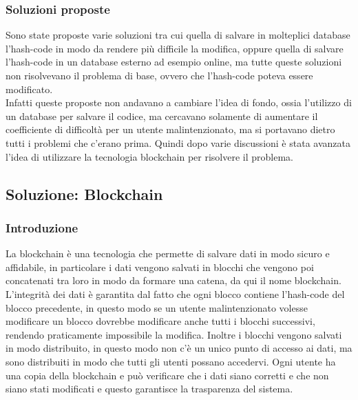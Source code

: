 \subsubsection{Soluzioni proposte}
Sono state proposte varie soluzioni tra cui quella di salvare in molteplici
database l'hash-code in modo da rendere più difficile la modifica, oppure
quella di salvare l'hash-code in un database esterno ad esempio online,
ma tutte queste soluzioni non risolvevano il problema di base, ovvero che
l'hash-code poteva essere modificato. \\
Infatti queste proposte non andavano a cambiare l'idea di fondo, ossia 
l'utilizzo di un database per salvare il codice, ma cercavano solamente 
di aumentare il coefficiente di difficoltà per un utente malintenzionato,
ma si portavano dietro tutti i problemi che c'erano prima.
Quindi dopo varie discussioni è stata avanzata l'idea di utilizzare la
tecnologia blockchain per risolvere il problema.

\newpage

\subsection{Soluzione: Blockchain}
\subsubsection{Introduzione}
La blockchain è una tecnologia che permette di salvare dati in modo sicuro e
affidabile, in particolare i dati vengono salvati in blocchi che vengono poi
concatenati tra loro in modo da formare una catena, da qui il nome
blockchain.\\
L'integrità dei dati è garantita dal fatto che ogni blocco contiene l'hash-code
del blocco precedente, in questo modo se un utente malintenzionato volesse
modificare un blocco dovrebbe modificare anche tutti i blocchi successivi,
rendendo praticamente impossibile la modifica.
Inoltre i blocchi vengono salvati in modo distribuito, in questo modo non c'è
un unico punto di accesso ai dati, ma sono distribuiti in modo che tutti gli
utenti possano accedervi. Ogni utente ha una copia della blockchain e può
verificare che i dati siano corretti e che non siano stati modificati e questo
garantisce la trasparenza del sistema.

